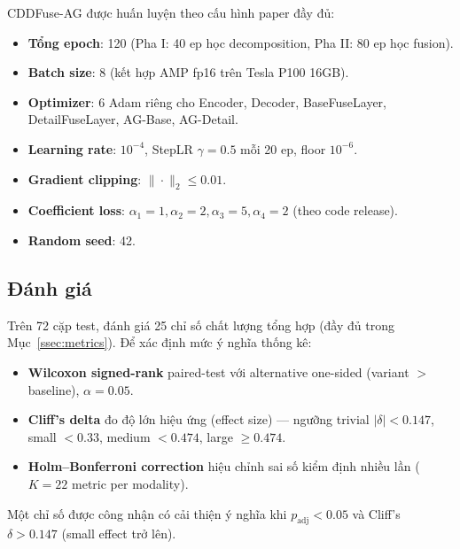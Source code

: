 CDDFuse-AG được huấn luyện theo cấu hình paper đầy đủ:
\begin{itemize}\itemsep0pt
    \item \textbf{Tổng epoch}: 120 (Pha I: 40 ep học decomposition, Pha II: 80 ep học fusion).
    \item \textbf{Batch size}: 8 (kết hợp AMP fp16 trên Tesla P100 16GB).
    \item \textbf{Optimizer}: 6 Adam riêng cho Encoder, Decoder, BaseFuseLayer, DetailFuseLayer, AG-Base, AG-Detail.
    \item \textbf{Learning rate}: $10^{-4}$, StepLR $\gamma = 0.5$ mỗi 20 ep, floor $10^{-6}$.
    \item \textbf{Gradient clipping}: $\|\cdot\|_2 \le 0.01$.
    \item \textbf{Coefficient loss}: $\alpha_1 = 1, \alpha_2 = 2, \alpha_3 = 5, \alpha_4 = 2$ (theo code release).
    \item \textbf{Random seed}: 42.
\end{itemize}

\subsection{Đánh giá}
\label{ssec:eval-procedure}

Trên 72 cặp test, đánh giá 25 chỉ số chất lượng tổng hợp (đầy đủ trong Mục~\ref{ssec:metrics}). Để xác định mức ý nghĩa thống kê:
\begin{itemize}\itemsep0pt
    \item \textbf{Wilcoxon signed-rank} \cite{wilcoxon1945individual} paired-test với alternative one-sided (variant $>$ baseline), $\alpha = 0.05$.
    \item \textbf{Cliff's delta} \cite{cliff1993dominance} đo độ lớn hiệu ứng (effect size) --- ngưỡng trivial $|\delta| < 0.147$, small $< 0.33$, medium $< 0.474$, large $\ge 0.474$.
    \item \textbf{Holm--Bonferroni correction} \cite{holm1979simple} hiệu chỉnh sai số kiểm định nhiều lần ($K = 22$ metric per modality).
\end{itemize}
Một chỉ số được công nhận có cải thiện ý nghĩa khi $p_{\mathrm{adj}} < 0.05$ và Cliff's $\delta > 0.147$ (small effect trở lên).
